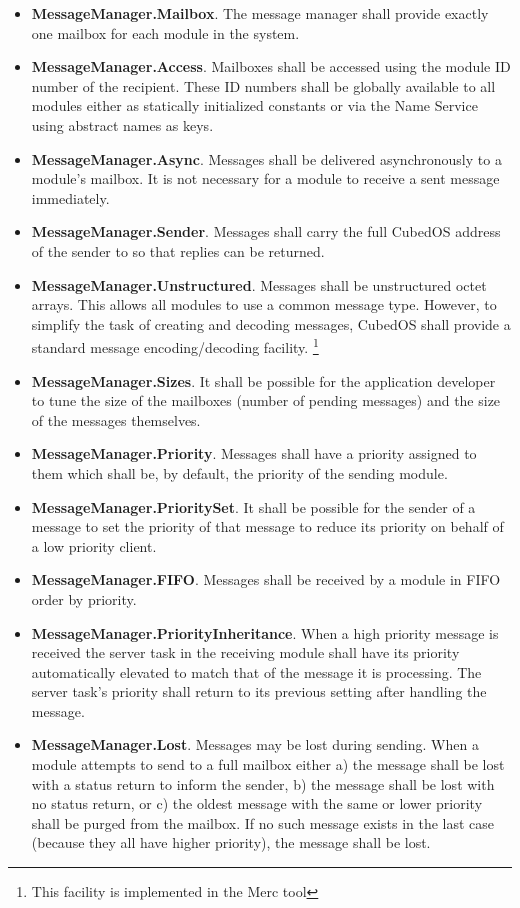 \begin{itemize}
\item \textbf{MessageManager.Mailbox}. The message manager shall provide exactly one mailbox for
  each module in the system.
\item \textbf{MessageManager.Access}. Mailboxes shall be accessed using the module ID number of
  the recipient. These ID numbers shall be globally available to all modules either as statically
  initialized constants or via the Name Service using abstract names as keys.
\item \textbf{MessageManager.Async}. Messages shall be delivered asynchronously to a module's
  mailbox. It is not necessary for a module to receive a sent message immediately.
\item \textbf{MessageManager.Sender}. Messages shall carry the full CubedOS address of the
  sender to so that replies can be returned.
\item \textbf{MessageManager.Unstructured}. Messages shall be unstructured octet arrays. This
  allows all modules to use a common message type. However, to simplify the task of creating and
  decoding messages, CubedOS shall provide a standard message encoding/decoding facility.
  \footnote{This facility is implemented in the Merc tool}
\item \textbf{MessageManager.Sizes}. It shall be possible for the application developer to tune
  the size of the mailboxes (number of pending messages) and the size of the messages
  themselves.
\item \textbf{MessageManager.Priority}. Messages shall have a priority assigned to them which
  shall be, by default, the priority of the sending module.
\item \textbf{MessageManager.PrioritySet}. It shall be possible for the sender of a message to
  set the priority of that message to reduce its priority on behalf of a low priority client.
\item \textbf{MessageManager.FIFO}. Messages shall be received by a module in FIFO order by
  priority.
\item \textbf{MessageManager.PriorityInheritance}. When a high priority message is received the
  server task in the receiving module shall have its priority automatically elevated to match
  that of the message it is processing. The server task's priority shall return to its previous
  setting after handling the message. 
\item \textbf{MessageManager.Lost}. Messages may be lost during sending. When a module attempts
  to send to a full mailbox either a) the message shall be lost with a status return to inform
  the sender, b) the message shall be lost with no status return, or c) the oldest message with
  the same or lower priority shall be purged from the mailbox. If no such message exists in the
  last case (because they all have higher priority), the message shall be lost.
\end{itemize}

